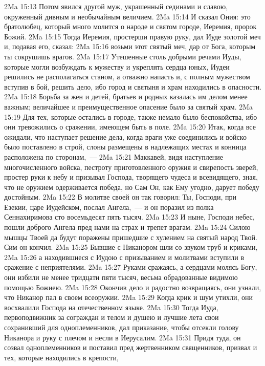 \vs 2Ma 15:13 Потом явился другой муж, украшенный сединами и славою, окруженный дивным и необычайным величием.
\vs 2Ma 15:14 И сказал Ония: это братолюбец, который много молится о народе и святом городе, Иеремия, пророк Божий.
\vs 2Ma 15:15 Тогда Иеремия, простерши правую руку, дал Иуде золотой меч и, подавая его, сказал:
\vs 2Ma 15:16 возьми этот святый меч, дар от Бога, которым ты сокрушишь врагов.
\rsbpar\vs 2Ma 15:17 Утешенные столь добрыми речами Иуды, которые могли возбуждать к мужеству и укреплять сердца юных, Иудеи решились не располагаться станом, а отважно напасть и, с полным мужеством вступив в бой, решить дело, ибо город и святыня и храм находились в опасности.
\vs 2Ma 15:18 Борьба за жен и детей, братьев и родных казалась им делом менее важным; величайшее и преимущественное опасение было за святый храм.
\vs 2Ma 15:19 Для тех, которые остались в городе, также немало было беспокойства, ибо они тревожились о сражении, имеющем быть в поле.
\rsbpar\vs 2Ma 15:20 Итак, когда все ожидали, что наступает решение дела, когда враги уже соединились и войско было поставлено в строй, слоны размещены в надлежащих местах и конница расположена по сторонам,~---
\vs 2Ma 15:21 Маккавей, видя наступление многочисленного войска, пестроту приготовленного оружия и свирепость зверей, простер руки к небу и призывал Господа, творящего чудеса и всевидящего, зная, что не оружием одерживается победа, но Сам Он, как Ему угодно, дарует победу достойным.
\vs 2Ma 15:22 В молитве своей он так говорил: Ты, Господи, при Езекии, царе Иудейском, послал Ангела,~--- и он поразил из полка Сеннахиримова сто восемьдесят пять тысяч.
\vs 2Ma 15:23 И ныне, Господи небес, пошли доброго Ангела пред нами на страх и трепет врагам.
\vs 2Ma 15:24 Силою мышцы Твоей да будут поражены пришедшие с хулением на святый народ Твой. Сим он кончил.
\vs 2Ma 15:25 Бывшие с Никанором шли со звуком труб и криками,
\vs 2Ma 15:26 а находившиеся с Иудою с призыванием и молитвами вступили в сражение с неприятелями.
\vs 2Ma 15:27 Руками сражаясь, а сердцами молясь Богу, они избили не менее тридцати пяти тысяч, весьма обрадованные видимою помощью Божиею.
\vs 2Ma 15:28 Окончив дело и радостно возвращаясь, они узнали, что Никанор пал в своем всеоружии.
\vs 2Ma 15:29 Когда крик и шум утихли, они восхвалили Господа на отечественном языке.
\vs 2Ma 15:30 Тогда Иуда, первоподвижник за сограждан и телом и душею и лучшие лета свои сохранивший для одноплеменников, дал приказание, чтобы отсекли голову Никанора и руку с плечом и несли в Иерусалим.
\vs 2Ma 15:31 Придя туда, он созвал одноплеменников и поставил пред жертвенником священников, призвал и тех, которые находились в крепости,
